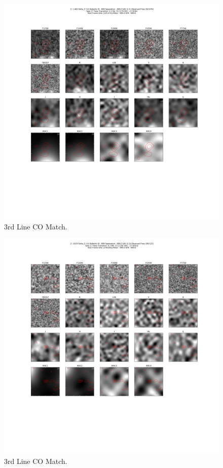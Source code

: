\begin{figure}[tbp]
\centering \includegraphics[width=120mm]{Matched/ASPECS_Cutout_29.png}
\caption{3rd Line CO Match.}
\label{fig:Match_Three}
\end{figure}

\begin{figure}[tbp]
\centering \includegraphics[width=120mm]{Matched/ASPECS_Cutout_30.png}
\caption{3rd Line CO Match.}
\label{fig:Match_Three}
\end{figure}

